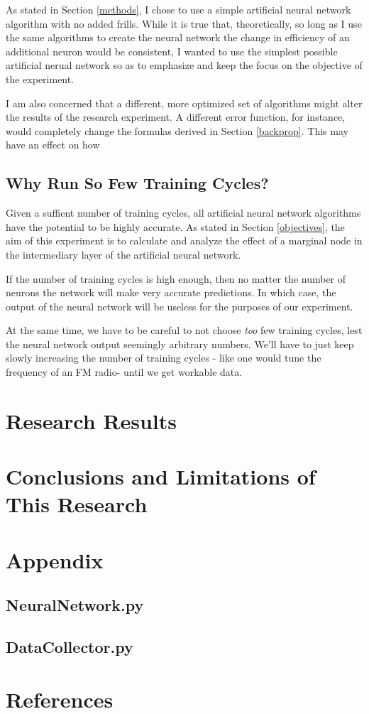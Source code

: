 \documentclass[12pt]{article}
\begin{document}
        As stated in Section \ref{methods}, I chose to use a simple artificial neural network algorithm with no added frills. While it is true that, theoretically, so long as I use the same algorithms to create the neural network the change in efficiency of an additional neuron would be consistent, I wanted to use the simplest possible artificial nerual network so as to emphasize and keep the focus on the objective of the experiment.

        I am also concerned that a different, more optimized set of algorithms might alter the results of the research experiment. A different error function, for instance, would completely change the formulas derived in Section \ref{backprop}. This may have an effect on how 
    
    \subsection{Why Run So Few Training Cycles?}

        Given a suffient number of training cycles, all artificial neural network algorithms have the potential to be highly accurate. As stated in Section \ref{objectives}, the aim of this experiment is to calculate and analyze the effect of a marginal node in the intermediary layer of the artificial neural network.

        If the number of training cycles is high enough, then no matter the number of neurons the network will make very accurate predictions. In which case, the output of the neural network will be useless for the purposes of our experiment. 

        At the same time, we have to be careful to not choose \textit{too} few training cycles, lest the neural network output seemingly arbitrary numbers. We'll have to just keep slowly increasing the number of training cycles - like one would tune the frequency of an FM radio- until we get workable data.

\section{Research Results \label{results}}

\section{Conclusions and Limitations of This Research \label{conclusions}}

\section{Appendix}

    \subsection{NeuralNetwork.py \label{neuralnetpy}}

    \subsection{DataCollector.py\label{datacollectorpy}}

\section{References}

    \printbibliography[heading=none]
\end{document}
